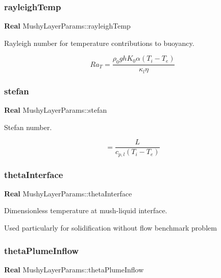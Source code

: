 \subsubsection{\texorpdfstring{rayleigh\+Temp}{rayleighTemp}}
{\footnotesize\ttfamily \textbf{ Real} Mushy\+Layer\+Params\+::rayleigh\+Temp}



Rayleigh number for temperature contributions to buoyancy. 

\[ Ra_T = \frac{\rho_0 g h K_0 \alpha (T_i - T_e)}{\kappa_l \eta} \] \mbox{\label{class_mushy_layer_params_ae226ddaa8dc0171b6fcb1e5393ef61a4}} 
\subsubsection{\texorpdfstring{stefan}{stefan}}
{\footnotesize\ttfamily \textbf{ Real} Mushy\+Layer\+Params\+::stefan}



Stefan number. 

\[ = \frac{L}{c_{p,l} (T_i - T_e)} \] \mbox{\label{class_mushy_layer_params_a4f5bbe8dd1098ccc6bac03fce6b6bfa0}} 
\subsubsection{\texorpdfstring{theta\+Interface}{thetaInterface}}
{\footnotesize\ttfamily \textbf{ Real} Mushy\+Layer\+Params\+::theta\+Interface}



Dimensionless temperature at mush-\/liquid interface. 

Used particularly for solidification without flow benchmark problem \mbox{\label{class_mushy_layer_params_abd2acb1163b9a8660abea009ecbc2a09}} 
\subsubsection{\texorpdfstring{theta\+Plume\+Inflow}{thetaPlumeInflow}}
{\footnotesize\ttfamily \textbf{ Real} Mushy\+Layer\+Params\+::theta\+Plume\+Inflow}



